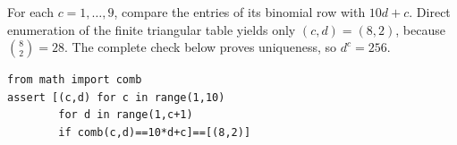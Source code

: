 For each $c=1,\ldots,9$, compare the entries of its binomial row with $10d+c$. Direct enumeration of the finite triangular table yields only $(c,d)=(8,2)$, because $\binom82=28$. The complete check below proves uniqueness, so $\boxed{d^c=256}$.\begin{verbatim}
from math import comb
assert [(c,d) for c in range(1,10)
        for d in range(1,c+1)
        if comb(c,d)==10*d+c]==[(8,2)]
\end{verbatim}
